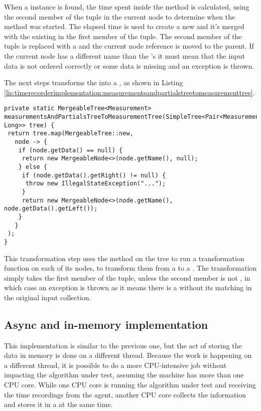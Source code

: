 \noindent When a  instance is found, the time spent inside the method is calculated, using the second member of the tuple in the current node to determine when the method was started. The elapsed time is used to create a new  and it's merged with the existing  in the first member of the tuple. The second member of the tuple is replaced with a  and the current node reference is moved to the parent. If the current node has a different name than the 's  it must mean that the input data is not ordered correctly or some data is missing and an exception is thrown.

\noindent The next steps transforms the  into a , as shown in Listing \ref{lis:timerecorderimplementation:measurementsandpartialstreetomeasurementtree}.

\noindent\begin{minipage}[c]{\linewidth}
\begin{lstlisting}[breaklines,caption={Second transformation step},label=lis:timerecorderimplementation:measurementsandpartialstreetomeasurementtree]
private static MergeableTree<Measurement> measurementsAndPartialsTreeToMeasurementTree(SimpleTree<Pair<Measurement, Long>> tree) {
 return tree.map(MergeableTree::new,
   node -> {
    if (node.getData() == null) {
     return new MergeableNode<>(node.getName(), null);
    } else {
     if (node.getData().getRight() != null) {
      throw new IllegalStateException("...");
     }
     return new MergeableNode<>(node.getName(), node.getData().getLeft());
    }
   }
 );
}
\end{lstlisting}
\end{minipage}

\noindent This transformation step uses the  method on the tree to run a transformation function on each of its nodes, to transform them from a  to a . The transformation simply takes the first member of the tuple, unless the second member is not , in which case an exception is thrown as it means there is a  without its matching  in the original input collection.


\subsection{Async and in-memory implementation}
\label{sec:implementation:timerecorderimplementation:asyncinmemory}
This implementation is similar to the previous one, but the act of storing the data in memory is done on a different thread. Because the work is happening on a different thread, it is possible to do a more CPU-intensive job without impacting the algorithm under test, assuming the machine has more than one CPU core. While one CPU core is running the algorithm under test and receiving the time recordings from the agent, another CPU core collects the information and stores it in a  at the same time.

